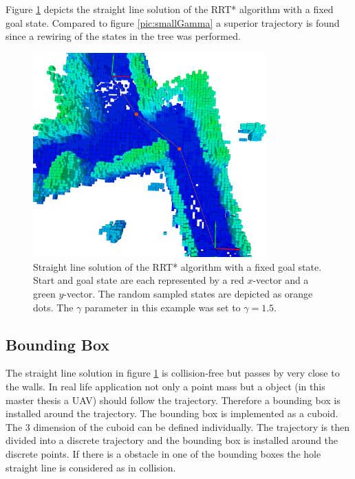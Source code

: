 Figure \ref{pic:smallBBX} depicts the straight line solution of the RRT* algorithm with a fixed goal state. Compared to figure \ref{pic:smallGamma} a superior trajectory is found since a rewiring of the states in the tree was performed.

\begin{figure}[H]
   \centering
   \includegraphics[trim = 50mm 0mm 30mm 0mm,clip,width=0.8\textwidth]{pics/smallBBXP.png}
   \caption{Straight line solution of the RRT* algorithm with a fixed goal state. Start and goal state are each represented by a red $x$-vector and a green $y$-vector. The random sampled states are depicted as orange dots. The $\gamma$ parameter in this example was set to $\gamma = 1.5$.}
   \label{pic:smallBBX}
\end{figure}


\subsection{Bounding Box}\label{sec:bbx}

The straight line solution in figure \ref{pic:smallBBX} is collision-free but passes by very close to the walls. In real life application not only a point mass but a object (in this master thesis a UAV) should follow the trajectory. Therefore a bounding box is installed around the trajectory. \newline
The bounding box is implemented as a cuboid. The 3 dimension of the cuboid can be defined individually. The trajectory is then divided into a discrete trajectory and the bounding box is installed around the discrete points. If there is a obstacle in one of the bounding boxes the hole straight line is considered as  in collision. \newline

